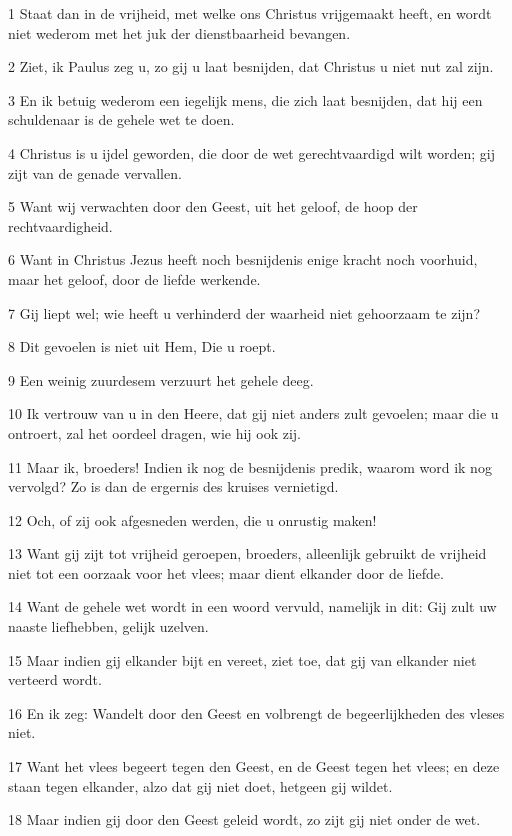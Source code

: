 \par 1 Staat dan in de vrijheid, met welke ons Christus vrijgemaakt heeft, en wordt niet wederom met het juk der dienstbaarheid bevangen.
\par 2 Ziet, ik Paulus zeg u, zo gij u laat besnijden, dat Christus u niet nut zal zijn.
\par 3 En ik betuig wederom een iegelijk mens, die zich laat besnijden, dat hij een schuldenaar is de gehele wet te doen.
\par 4 Christus is u ijdel geworden, die door de wet gerechtvaardigd wilt worden; gij zijt van de genade vervallen.
\par 5 Want wij verwachten door den Geest, uit het geloof, de hoop der rechtvaardigheid.
\par 6 Want in Christus Jezus heeft noch besnijdenis enige kracht noch voorhuid, maar het geloof, door de liefde werkende.
\par 7 Gij liept wel; wie heeft u verhinderd der waarheid niet gehoorzaam te zijn?
\par 8 Dit gevoelen is niet uit Hem, Die u roept.
\par 9 Een weinig zuurdesem verzuurt het gehele deeg.
\par 10 Ik vertrouw van u in den Heere, dat gij niet anders zult gevoelen; maar die u ontroert, zal het oordeel dragen, wie hij ook zij.
\par 11 Maar ik, broeders! Indien ik nog de besnijdenis predik, waarom word ik nog vervolgd? Zo is dan de ergernis des kruises vernietigd.
\par 12 Och, of zij ook afgesneden werden, die u onrustig maken!
\par 13 Want gij zijt tot vrijheid geroepen, broeders, alleenlijk gebruikt de vrijheid niet tot een oorzaak voor het vlees; maar dient elkander door de liefde.
\par 14 Want de gehele wet wordt in een woord vervuld, namelijk in dit: Gij zult uw naaste liefhebben, gelijk uzelven.
\par 15 Maar indien gij elkander bijt en vereet, ziet toe, dat gij van elkander niet verteerd wordt.
\par 16 En ik zeg: Wandelt door den Geest en volbrengt de begeerlijkheden des vleses niet.
\par 17 Want het vlees begeert tegen den Geest, en de Geest tegen het vlees; en deze staan tegen elkander, alzo dat gij niet doet, hetgeen gij wildet.
\par 18 Maar indien gij door den Geest geleid wordt, zo zijt gij niet onder de wet.

